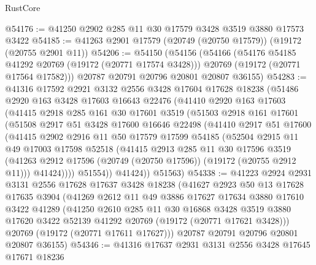 \begin{lexlean}{RustCore}
\begin{coremodule}
@54176 := @41250 @2902 @285 @11 @30 @17579 @3428 @3519 @3880 @17573 @3422
@54185 := @41263 @2901 @17579 (@20749 (@20750 @17579)) (@19172 (@20755 @2901 @11))
@54206 := @54150
    (@54156
      (@54166
        (@54176 @54185 @41292 @20769 (@19172 (@20771 @17574 @3428)))
        @20769
        (@19172 (@20771 @17564 @17582)))
      @20787
      @20791
      @20796
      @20801
      @20807
      @36155)
@54283 := @41316
    @17592
    @2921
    @3132
    @2556
    @3428
    @17604
    @17628
    @18238
    (@51486
      @2920
      @163
      @3428
      @17603
      @16643
      @22476
      (@41410
        @2920
        @163
        @17603
        (@41415
          @2918
          @285
          @161
          @30
          @17601
          @3519
          (@51503
            @2918
            @161
            @17601
            (@51508
              @2917
              @51
              @3428
              @17600
              @16646
              @22498
              (@41410
                @2917
                @51
                @17600
                (@41415
                  @2902
                  @2916
                  @11
                  @50
                  @17579
                  @17599
                  @54185
                  (@52504
                    @2915
                    @11
                    @49
                    @17003
                    @17598
                    @52518
                    (@41415
                      @2913
                      @285
                      @11
                      @30
                      @17596
                      @3519
                      (@41263 @2912 @17596 (@20749 (@20750 @17596)) (@19172 (@20755 @2912 @11)))
                      @41424))))
              @51554))
          @41424))
      @51563)
@54338 := @41223
    @2924
    @2931
    @3131
    @2556
    @17628
    @17637
    @3428
    @18238
    (@41627
      @2923
      @50
      @13
      @17628
      @17635
      @3904
      (@41269
        @2612
        @11
        @49
        @3886
        @17627
        @17634
        @3880
        @17610
        @3422
        @41289
        (@41250
          @2610
          @285
          @11
          @30
          @16868
          @3428
          @3519
          @3880
          @17620
          @3422
          @52139
          @41292
          @20769
          (@19172 (@20771 @17621 @3428)))
        @20769
        (@19172 (@20771 @17611 @17627)))
      @20787
      @20791
      @20796
      @20801
      @20807
      @36155)
@54346 := @41316 @17637 @2931 @3131 @2556 @3428 @17645 @17671 @18236

\end{coremodule}
\end{lexlean}
